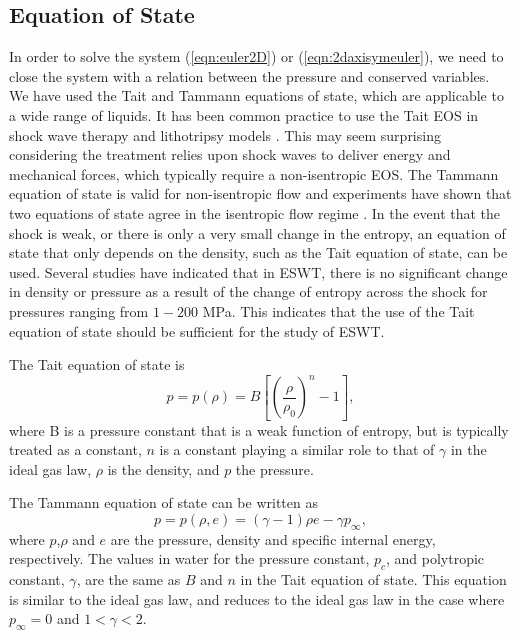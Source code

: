 \documentclass{article}
\begin{document}
\subsection{Equation of State}
\label{sec:eos_discussion}
In order to solve the system (\ref{eqn:euler2D}) or (\ref{eqn:2daxisymeuler}), we need to close the 
system with a relation between the pressure and conserved variables.  We have used the Tait 
\cite{thompson} and Tammann \cite{ivings_toro} equations of state, which are applicable to a wide range 
of liquids.  It has been common practice to use the Tait EOS in shock wave therapy and lithotripsy 
models \cite{saito,nakahara_hugoniot}.  This may seem surprising considering the treatment relies upon 
shock waves to deliver energy and mechanical forces, which typically require a non-isentropic EOS.  
The Tammann equation of state is valid for non-isentropic flow and experiments have shown that two 
equations of state agree in the isentropic flow regime \cite{thompson}.  In the event that the shock is 
weak, or there is only a very small change in the entropy, an equation of state that only depends on the 
density, such as the Tait equation of state, can be used.  Several studies have indicated that in ESWT, 
there is no significant change in density or pressure as a result of the change of entropy across the 
shock \cite{nakahara} for pressures ranging from $1-200$ MPa.  This indicates that the use of the Tait 
equation of state should be sufficient for the study of ESWT.

The Tait equation of state is
\begin{equation}
	p = p(\rho) = B\left[ \left(\frac{\rho}{\rho_0}\right)^n - 1\right], 
	\label{eqn:taiteos}
\end{equation}
where B is a pressure constant that is a weak function of entropy, but is typically treated as a constant, 
$n$ is a constant playing a similar role to that of $\gamma$ in the ideal gas law, $\rho$ is the density, 
and $p$ the pressure.

The Tammann equation of state can be written as
\begin{equation}
	p = p(\rho, e) = (\gamma - 1)\rho e - \gamma p_{\infty},
	\label{eqn:tammaneos}
\end{equation}
where $p$,$\rho$ and $e$ are the pressure, density and specific internal energy, respectively.  The 
values in water for the pressure constant, $p_c$, and polytropic constant, $\gamma$, are the same as 
$B$ and $n$ in the Tait equation of state.  This equation is similar to the ideal gas law, and reduces to 
the ideal gas law in the case where $p_{\infty} = 0$ and $ 1 < \gamma < 2$.
\end{document}
